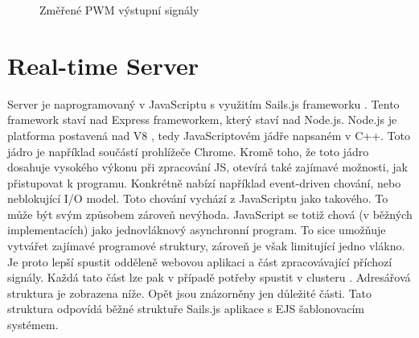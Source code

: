 \begin{figure}[H]
    \centering
	\caption{Změřené PWM výstupní signály}
	\label{fig:pwm}
\end{figure}

\section{Real-time Server}
Server je naprogramovaný v JavaScriptu s využitím Sails.js  frameworku \cite{sails}. Tento framework staví nad Express frameworkem, který staví nad Node.js. Node.js je platforma postavená nad V8 \cite{v8}, tedy JavaScriptovém jádře napsaném v C++. Toto jádro je například součástí prohlížeče Chrome.  Kromě toho, že toto jádro dosahuje vysokého výkonu při zpracování JS, otevírá také zajímavé možnosti, jak přistupovat k programu. Konkrétně nabízí například event-driven chování, nebo neblokující I/O model. Toto chování vychází z JavaScriptu jako takového. To může být svým způsobem zároveň nevýhoda. JavaScript se totiž chová (v běžných implementacích) jako jednovláknový asynchronní program. To sice umožňuje vytvářet zajímavé programové struktury, zároveň je však limitující jedno vlákno. Je proto lepší spustit odděleně webovou aplikaci a část zpracovávající příchozí signály. Každá tato část lze pak v případě potřeby spustit v clusteru \cite{cluster}. Adresářová struktura je zobrazena níže. Opět jsou znázorněny jen důležité části. Tato struktura odpovídá běžné struktuře Sails.js \cite{sails} aplikace s EJS šablonovacím systémem.

